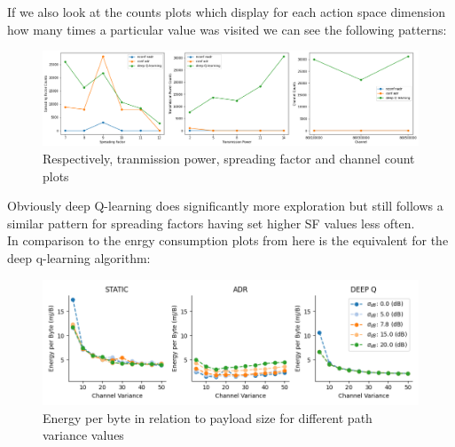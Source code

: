 If we also look at the counts plots which display
for each action space dimension how many times
a particular value was visited we can see the following patterns:

\begin{figure}[H]
\centering
\hspace*{-1.5cm}  
\includegraphics[scale=0.40]{plots/adr/adr_inspection_counts.png}
  \caption{Respectively, tranmission power, spreading factor and channel count plots}
\end{figure}

Obviously deep Q-learning does significantly more
exploration but still follows a similar pattern for spreading factors having set higher SF values less
often. \\

In comparison to the enrgy consumption plots 
from \cite{simulator} here is the equivalent
for the deep q-learning algorithm:

\newpage

\begin{figure}[H]
\centering
\hspace*{-1.5cm}  
\includegraphics[scale=0.50]{plots/adr/energy_payload.png}
  \caption{Energy per byte in relation to payload size for different path variance values}
\end{figure}

